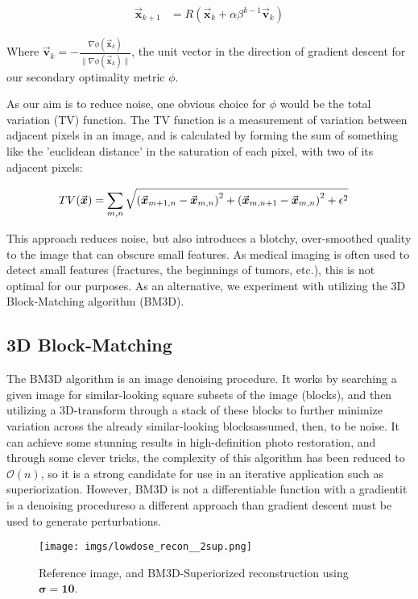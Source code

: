 \documentclass[sigconf,twocolumn,nonacm=true]{acmart}
\newcommand{\tighten}{\vspace*{-6pt plus -2pt minus -2pt}} %
\newcommand{\emd}{\text{\textemdash}} %
\newcommand{\enc}[1]{\left( #1 \right)} %
\newcommand{\vvec}[1]{\vec{\boldsymbol{#1}}} %
\newcommand{\norm}[1]{\lVert #1 \rVert} %
\newcommand{\bigo}[1]{\mathscr{O}\enc{#1}} %
\newcommand{\eps}{\epsilon} %
\newcommand{\ds}{\displaystyle} %
\newcommand{\lump}[1]{\mathclap{\substack{#1}}} %
\newcommand{\Sum}[2]{\ds\sum_{\lump{#1}}^{\lump{#2}}} %
\begin{document}
\tighten\tighten
\begin{align}
    \vvec{x}_{k+1} &= R(\vvec{x}_k+\alpha\beta^{k-1}\vvec{v}_k)
\end{align}

Where $\vvec{v}_k=-\ds\frac{\nabla\phi(\vvec{x}_k)}{\norm{\nabla\phi(\vvec{x}_k)}}$, the unit vector in the direction of gradient descent for our secondary optimality metric $\phi$.

As our aim is to reduce noise, one obvious choice for $\phi$ would be the total variation (TV) function. The TV function is a measurement of variation between adjacent pixels in an image, and is calculated by forming the sum of something like the 'euclidean distance' in the saturation of each pixel, with two of its adjacent pixels\cite{pnp}:

\tighten
\begin{align}
    {TV}(\vvec{x}) &= \Sum{m,n}{}\sqrt{\enc{\vvec{x}_{m+1,n} - \vvec{x}_{m,n}}^2 + \enc{\vvec{x}_{m,n+1} - \vvec{x}_{m,n}}^2 + \eps^2}
\end{align}

This approach reduces noise, but also introduces a blotchy, over-smoothed quality to the image that can obscure small features. As medical imaging is often used to detect small features (fractures, the beginnings of tumors, etc.), this is not optimal for our purposes. As an alternative, we experiment with utilizing the 3D Block-Matching algorithm (BM3D)\cite{dabov2007image}.

\subsection{3D Block-Matching}\tighten
The BM3D algorithm is an image denoising procedure. It works by searching a given image for similar-looking square subsets of the image (blocks), and then utilizing a 3D-transform through a stack of these blocks to further minimize variation across the already similar-looking blocks\emd assumed, then, to be noise. It can achieve some stunning results in high-definition photo restoration, and through some clever tricks, the complexity of this algorithm has been reduced to $\bigo{n}$, so it is a strong candidate for use in an iterative application such as superiorization. However, BM3D is not a differentiable function with a gradient\emd it is a denoising procedure\emd so a different approach than gradient descent must be used to generate perturbations.

\begin{figure}[b]
    \centering
    \texttt{[image: imgs/lowdose\_recon\_\_2sup.png]}
    \caption{Reference image, and BM3D-Superiorized reconstruction using $\boldsymbol{\sigma=10}$.}
    \label{spooky}
\end{figure}
\end{document}
